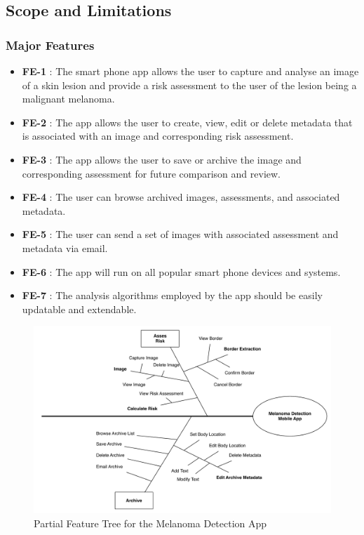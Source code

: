     \subsection{Scope and Limitations}
    \subsubsection{Major Features}
        \noindent
        \begin{itemize}[leftmargin=*]
            \item[]  \textbf{FE-1} : The smart phone app allows the user to capture and analyse an image of a skin lesion and provide a risk assessment to the user of the lesion being a malignant melanoma.

            \item[] \textbf{FE-2} : The app allows the user to create, view, edit or delete metadata that is associated with an image and corresponding risk assessment.

            \item[] \textbf{FE-3} : The app allows the user to save or archive the image and corresponding assessment for future comparison and review.

            \item[] \textbf{FE-4} : The user can browse archived images, assessments, and associated metadata.

            \item[] \textbf{FE-5} : The user can send a set of images with associated assessment and metadata via email.

            \item[] \textbf{FE-6} : The app will run on all popular smart phone devices and systems.

            \item[] \textbf{FE-7} : The analysis algorithms employed by the app should be easily updatable and extendable.
        \end{itemize}

        \begin{figure}[H]
            \centering
            \includegraphics[width=\textwidth]{assets/requirements/PartialFeatureTree.pdf}
            \caption{Partial Feature Tree for the Melanoma Detection App}
            \label{fig:partial_feature_tree}
        \end{figure}


